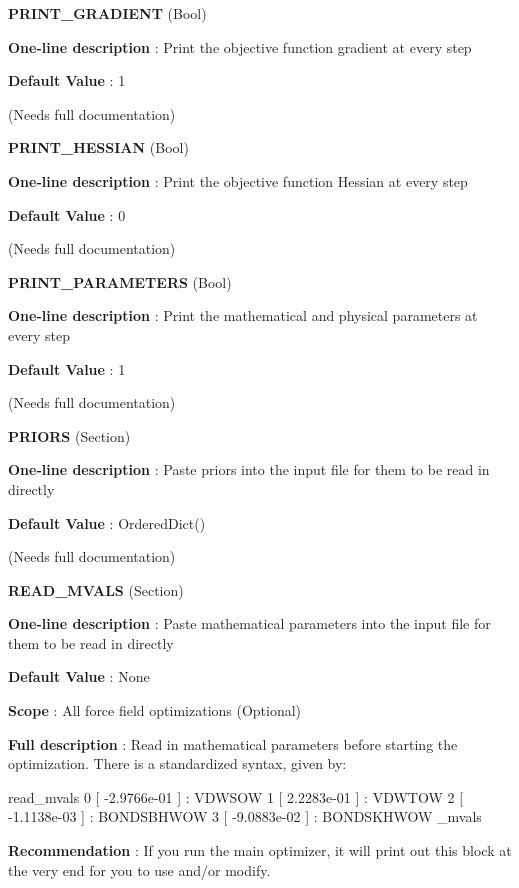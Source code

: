 \begin{DoxyItemize}
\item {\bfseries  P\-R\-I\-N\-T\-\_\-\-G\-R\-A\-D\-I\-E\-N\-T } (Bool) \par
{\bfseries  One-\/line description }\-: Print the objective function gradient at every step \par
{\bfseries  Default Value }\-: 1 \par
(Needs full documentation)\end{DoxyItemize}
\begin{DoxyItemize}
\item {\bfseries  P\-R\-I\-N\-T\-\_\-\-H\-E\-S\-S\-I\-A\-N } (Bool) \par
{\bfseries  One-\/line description }\-: Print the objective function Hessian at every step \par
{\bfseries  Default Value }\-: 0 \par
(Needs full documentation)\end{DoxyItemize}
\begin{DoxyItemize}
\item {\bfseries  P\-R\-I\-N\-T\-\_\-\-P\-A\-R\-A\-M\-E\-T\-E\-R\-S } (Bool) \par
{\bfseries  One-\/line description }\-: Print the mathematical and physical parameters at every step \par
{\bfseries  Default Value }\-: 1 \par
(Needs full documentation)\end{DoxyItemize}
\begin{DoxyItemize}
\item {\bfseries  P\-R\-I\-O\-R\-S } (Section) \par
{\bfseries  One-\/line description }\-: Paste priors into the input file for them to be read in directly \par
{\bfseries  Default Value }\-: Ordered\-Dict() \par
(Needs full documentation)\end{DoxyItemize}
\begin{DoxyItemize}
\item {\bfseries  R\-E\-A\-D\-\_\-\-M\-V\-A\-L\-S } (Section) \par
{\bfseries  One-\/line description }\-: Paste mathematical parameters into the input file for them to be read in directly \par
{\bfseries  Default Value }\-: None \par
{\bfseries  Scope }\-: All force field optimizations (Optional) \par
{\bfseries  Full description }\-: Read in mathematical parameters before starting the optimization. There is a standardized syntax, given by\-: \begin{DoxyVerb}read_mvals
0 [ -2.9766e-01 ] : VDWSOW
1 [  2.2283e-01 ] : VDWTOW
2 [ -1.1138e-03 ] : BONDSBHWOW
3 [ -9.0883e-02 ] : BONDSKHWOW
\read_mvals \end{DoxyVerb}
 \par
{\bfseries  Recommendation }\-: If you run the main optimizer, it will print out this block at the very end for you to use and/or modify.\end{DoxyItemize}
